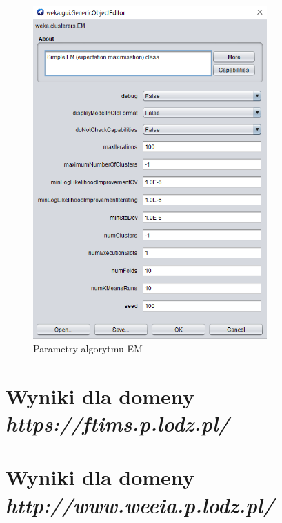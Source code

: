\documentclass{classrep}
\begin{document}
{{            \begin{figure}[!htbp]
                \centering
                \includegraphics[width=0.8\textwidth]{img/em-setup.png}
                \caption{Parametry algorytmu EM}
                \label{em_setup}
            \end{figure}
            \FloatBarrier
        }
    }
    \newpage

    \section{Wyniki dla domeny \textit{https://ftims.p.lodz.pl/}} {
        
    }
    \newpage

    \section{Wyniki dla domeny \textit{http://www.weeia.p.lodz.pl/}} {
        
    }
\end{document}
